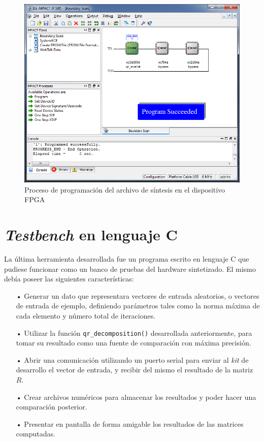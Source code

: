 \begin{figure}[!h]
  \begin{center}
    \includegraphics[width=9 cm]{./figures/C05-ISE_programming}
    \caption{Proceso de programación del archivo de síntesis en el dispositivo FPGA}
    \label{fig:ISE_programming}
  \end{center}
\end{figure}

\section{\textit{Testbench} en lenguaje C}
\label{sec:testbench_en_lenguaje_c}

La última herramienta desarrollada fue un programa escrito en lenguaje C que pudiese funcionar como un banco de pruebas del hardware sintetizado. El mismo debía poseer las siguientes características:

\begin{itemize}
   \item[•] Generar un dato que representara vectores de entrada aleatorios, o vectores de entrada de ejemplo, definiendo parámetros tales como la norma máxima de cada elemento y número total de iteraciones.
   \item[•] Utilizar la función \verb;qr_decomposition(); desarrollada anteriormente, para tomar su resultado como una fuente de comparación con máxima precisión.
   \item[•] Abrir una comunicación utilizando un puerto serial para enviar al \textit{kit} de desarrollo el vector de entrada, y recibir del mismo el resultado de la matriz $R$.
   \item[•] Crear archivos numéricos para almacenar los resultados y poder hacer una comparación posterior.
   \item[•] Presentar en pantalla de forma amigable los resultados de las matrices computadas.
\end{itemize}

